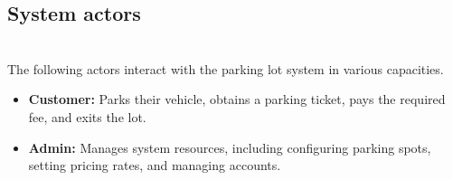 \subsection{System actors}\label{KP3D32CpsPjpiDzRgCxAB}
\\
The following actors interact with the parking lot system in various capacities.

\begin{itemize}
\item
\protect{}\label{HfEgtN7advpLR0UyDMiLW}
\textbf{Customer:} Parks their vehicle, obtains a parking ticket, pays the required fee, and exits the lot.
\item
\protect{}\label{dRiNC4Mg2-dTXyTiLBujp}
\textbf{Admin:} Manages system resources, including configuring parking spots, setting pricing rates, and managing accounts.
\end{itemize}

